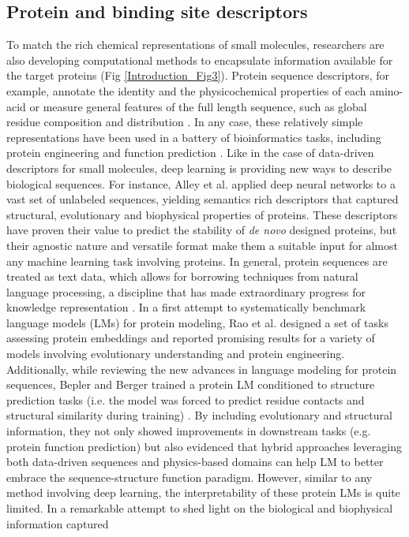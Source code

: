 \subsection{Protein and binding site descriptors}
\label{Introduction_proteindescriptors}

To match the rich chemical representations of small molecules, researchers are also developing computational methods to encapsulate information available for the target proteins (Fig \ref{Introduction_Fig3}). Protein sequence descriptors, for example, annotate the identity and the physicochemical properties of each amino-acid \cite{hellberg_peptide_1987} or measure general features of the full length sequence, such as global residue composition and distribution \cite{xiao_protrprotrweb_2015}. In any case, these relatively simple representations have been used in a battery of bioinformatics tasks, including protein engineering \cite{xu_deep_2020} and function prediction \cite{kulmanov_deepgoplus_2020}. Like in the case of data-driven descriptors for small molecules, deep learning is providing new ways to describe biological sequences. For instance, Alley et al. \cite{alley_unified_2019} applied deep neural networks to a vast set of unlabeled sequences, yielding semantics rich descriptors that captured structural, evolutionary and biophysical properties of proteins. These descriptors have proven their value to predict the stability of \textit{de novo} designed proteins, but their agnostic nature and versatile format make them a suitable input for almost any machine learning task involving proteins. In general, protein sequences are treated as text data, which allows for borrowing techniques from natural language processing, a discipline that has made extraordinary progress for knowledge representation \cite{asgari_continuous_2015, heinzinger_modeling_2019}. In a first attempt to systematically benchmark language models (LMs) for protein modeling, Rao et al. \cite{rao_evaluating_2019} designed a set of tasks assessing protein embeddings and reported promising results for a variety of models involving evolutionary understanding and protein engineering. Additionally, while reviewing the new advances in language modeling for protein sequences, Bepler and Berger \cite{bepler_learning_2019} trained a protein LM conditioned to structure prediction tasks (i.e. the model was forced to predict residue contacts and structural similarity during training) \cite{bepler_learning_2021}. By including evolutionary and structural information, they not only showed improvements in downstream tasks (e.g. protein function prediction) but also evidenced that hybrid approaches leveraging both data-driven sequences and physics-based domains can help LM to better embrace the sequence-structure function paradigm. However, similar to any method involving deep learning, the interpretability of these protein LMs is quite limited. In a remarkable attempt to shed light on the biological and biophysical information captured 